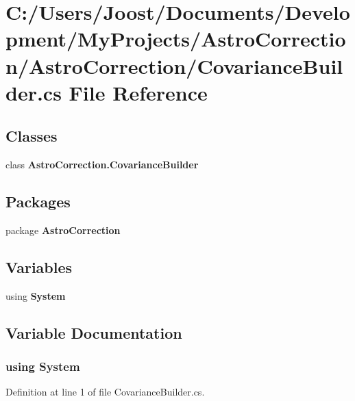 \section{C:/Users/Joost/Documents/Development/MyProjects/AstroCorrection/AstroCorrection/CovarianceBuilder.cs File Reference}
\label{_covariance_builder_8cs}
\subsection*{Classes}
\begin{DoxyCompactItemize}
\item 
class {\bf AstroCorrection.CovarianceBuilder}
\end{DoxyCompactItemize}
\subsection*{Packages}
\begin{DoxyCompactItemize}
\item 
package {\bf AstroCorrection}
\end{DoxyCompactItemize}
\subsection*{Variables}
\begin{DoxyCompactItemize}
\item 
﻿using {\bf System}
\end{DoxyCompactItemize}


\subsection{Variable Documentation}
\subsubsection[{System}]{\setlength{\rightskip}{0pt plus 5cm}﻿using {\bf System}}\label{_covariance_builder_8cs_a81a223a02c34d82b47199f08308847f2}


Definition at line 1 of file CovarianceBuilder.cs.